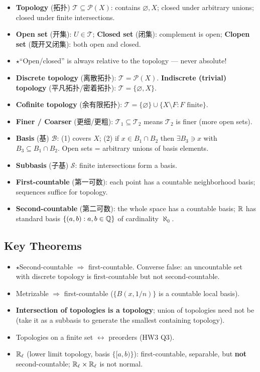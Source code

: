 \documentclass{article}
\newcommand{\starKey}{\textcolor{red!65!black}{\textbf{$\star$}}}
\begin{document}
\begin{itemize}
  \item \textbf{Topology} (拓扑) $\mathcal{T}\subseteq\mathcal{P}(X)$: contains
  $\varnothing, X$; closed under arbitrary unions; closed under finite intersections.
  \item \textbf{Open set} (开集): $U\in\mathcal{T}$;
  \textbf{Closed set} (闭集): complement is open;
  \textbf{Clopen set} (既开又闭集): both open and closed.
  \item \starKey ``Open/closed'' is always relative to the topology --- never absolute!
  \item \textbf{Discrete topology} (离散拓扑): $\mathcal{T}=\mathcal{P}(X)$.
  \textbf{Indiscrete (trivial) topology} (平凡拓扑/密着拓扑): $\mathcal{T}=\{\varnothing,X\}$.
  \item \textbf{Cofinite topology} (余有限拓扑):
  $\mathcal{T}=\{\varnothing\}\cup\{X\setminus F:F\text{ finite}\}$.
  \item \textbf{Finer / Coarser} (更细/更粗): $\mathcal{T}_1\subseteq\mathcal{T}_2$
  means $\mathcal{T}_2$ is finer (more open sets).
  \item \textbf{Basis} (基) $\mathcal{B}$: (1) covers $X$;
  (2) if $x\in B_1\cap B_2$ then $\exists B_3\ni x$ with $B_3\subseteq B_1\cap B_2$.
  Open sets = arbitrary unions of basis elements.
  \item \textbf{Subbasis} (子基) $\mathcal{S}$: finite intersections form a basis.
  \item \textbf{First-countable} (第一可数): each point has a countable neighborhood basis;
  sequences suffice for topology.
  \item \textbf{Second-countable} (第二可数): the whole space has a countable basis;
  $\mathbb{R}$ has standard basis $\{(a,b):a,b\in\mathbb{Q}\}$ of cardinality $\aleph_0$.
\end{itemize}

\subsection{Key Theorems}

\begin{itemize}
  \item \starKey Second-countable $\Rightarrow$ first-countable. Converse false:
  an uncountable set with discrete topology is first-countable but not second-countable.
  \item Metrizable $\Rightarrow$ first-countable ($\{B(x,1/n)\}$ is a countable local basis).
  \item \textbf{Intersection of topologies is a topology}; union of topologies need not be
  (take it as a subbasis to generate the smallest containing topology).
  \item Topologies on a finite set $\leftrightarrow$ preorders (HW3 Q3).
  \item $\mathbb{R}_\ell$ (lower limit topology, basis $\{[a,b)\}$): first-countable, separable,
  but \textbf{not} second-countable; $\mathbb{R}_\ell\times\mathbb{R}_\ell$ is not normal.
\end{itemize}
\end{document}
